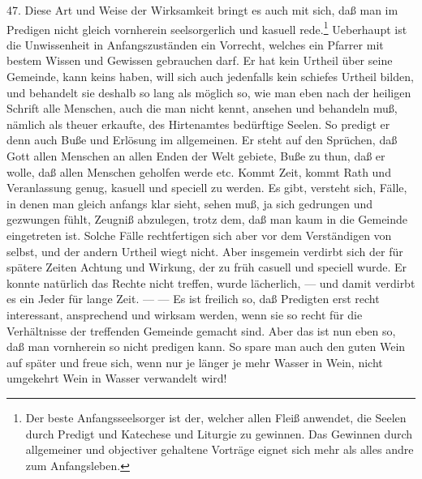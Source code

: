 47. Diese Art und Weise der Wirksamkeit bringt es auch mit sich, daß man im Predigen nicht gleich vornherein seelsorgerlich und kasuell rede.\footnote{Der beste Anfangsseelsorger ist der, welcher allen Fleiß anwendet, die Seelen durch Predigt und Katechese und Liturgie zu gewinnen. Das Gewinnen durch allgemeiner und objectiver gehaltene Vorträge eignet sich mehr als alles andre zum Anfangsleben.} Ueberhaupt ist die Unwissenheit in Anfangszuständen ein Vorrecht, welches ein Pfarrer mit bestem Wissen und Gewissen gebrauchen darf. Er hat kein Urtheil über seine Gemeinde, kann keins haben, will sich auch jedenfalls kein schiefes Urtheil bilden, und behandelt sie deshalb so lang als möglich so, wie man eben nach der heiligen Schrift alle Menschen, auch die man nicht kennt, ansehen und behandeln muß, nämlich als theuer erkaufte, des Hirtenamtes bedürftige Seelen. So predigt er denn auch Buße und Erlösung im allgemeinen. Er steht auf den Sprüchen, daß Gott allen Menschen an allen Enden der Welt gebiete, Buße zu thun, daß er wolle, daß allen Menschen geholfen werde etc. Kommt Zeit, kommt Rath und Veranlassung genug, kasuell und
speciell zu werden. Es gibt, versteht sich, Fälle, in denen man gleich anfangs klar sieht, sehen muß, ja sich gedrungen und gezwungen fühlt, Zeugniß abzulegen, trotz dem, daß man kaum in die Gemeinde eingetreten ist. Solche Fälle rechtfertigen sich aber vor dem Verständigen von selbst, und der andern Urtheil wiegt nicht. Aber insgemein verdirbt sich der für spätere Zeiten Achtung und Wirkung, der zu früh casuell und speciell wurde. Er konnte natürlich das Rechte nicht treffen, wurde lächerlich, — und damit verdirbt es ein Jeder für lange Zeit. — — Es ist freilich so, daß Predigten erst recht interessant, ansprechend und wirksam werden, wenn sie so recht für die Verhältnisse der treffenden Gemeinde gemacht sind. Aber das ist nun eben so, daß man vornherein so nicht predigen kann. So spare man auch den guten Wein auf später und freue sich, wenn nur je länger je mehr Wasser in Wein, nicht umgekehrt Wein in Wasser verwandelt wird!


